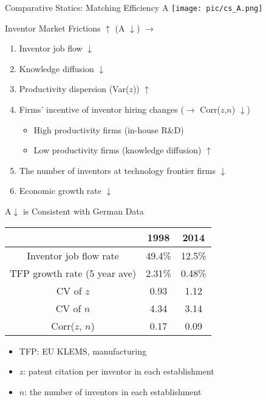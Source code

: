 \documentclass{beamer}
\begin{document}
\begin{frame}{Comparative Statics: Matching Efficiency A  \hypertarget{20}{}\hyperlink{21}{}}
  \centering
  \texttt{[image: pic/cs\_A.png]}
\end{frame}

\begin{frame}{Inventor Market Frictions $\uparrow$ (A $\downarrow$)  $\rightarrow$ }
  \begin{enumerate}
    \setlength\itemsep{3mm}
    \item Inventor job flow $\downarrow$
    \item Knowledge diffusion $\downarrow$
    \item Productivity dispersion (Var($z$)) $\uparrow$
    \item Firms' incentive of inventor hiring changes ($\rightarrow$ Corr($z$,$n$) $\downarrow$)
          \begin{itemize}
            \item High productivity firms (in-house R\&D)
            \item Low productivity firms (knowledge diffusion) $\uparrow$
          \end{itemize}
    \item The number of inventors at technology frontier firms $\downarrow$
    \item Economic growth rate $\downarrow$
  \end{enumerate}
\end{frame}


\begin{frame}{A$\downarrow$ is Consistent with German Data  \hypertarget{18}{}\hyperlink{17}{}}
  \begin{center}
    \begin{tabular}{c c c}
                                   & 1998   & 2014   \\
      \hline
      \hline
      Inventor job flow rate       & 49.4\% & 12.5\% \\
      \hline
      TFP growth rate (5 year ave) & 2.31\% & 0.48\% \\
      \hline
      CV of $z$                    & 0.93   & 1.12   \\
      \hline
      CV of $n$                    & 4.34   & 3.14   \\
      \hline
      Corr($z$, $n$)               & 0.17   & 0.09   \\
    \end{tabular}
  \end{center}
  {\footnotesize
  \begin{itemize}
    \item TFP: EU KLEMS, manufacturing
    \item $z$: patent citation per inventor in each establishment
    \item $n$: the number of inventors in each establishment
  \end{itemize}
  }
\end{frame}
\end{document}
